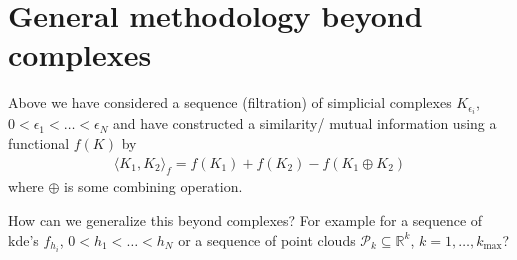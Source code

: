 

\section{General methodology beyond complexes}

Above we have considered a sequence (filtration) of simplicial complexes $K_{\epsilon_i}$, $0<\epsilon_1<\dots<\epsilon_N$ and have constructed a similarity/ mutual information using a functional $f(K)$ by
\begin{align*}
    \langle K_1,K_2\rangle_f=f(K_1)+f(K_2)-f(K_1\oplus K_2)
\end{align*}
where $\oplus$ is some combining operation.

How can we generalize this beyond complexes? For example for a sequence of kde's $f_{h_i}$, $0<h_1<\dots<h_N$ or a sequence of point clouds $\mathcal{P}_k\subseteq\mathbb{R}^{k}$, $k=1,\dots,k_{\max}$?